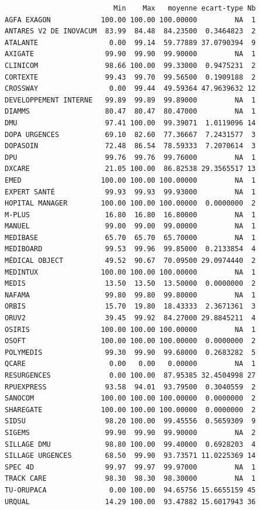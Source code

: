 \documentclass[]{article}
\begin{document}
\begin{verbatim}
                          Min    Max   moyenne ecart-type Nb
AGFA EXAGON            100.00 100.00 100.00000         NA  1
ANTARES V2 DE INOVACUM  83.99  84.48  84.23500  0.3464823  2
ATALANTE                 0.00  99.14  59.77889 37.0790394  9
AXIGATE                 99.90  99.90  99.90000         NA  1
CLINICOM                98.66 100.00  99.33000  0.9475231  2
CORTEXTE                99.43  99.70  99.56500  0.1909188  2
CROSSWAY                 0.00  99.44  49.59364 47.9639632 12
DEVELOPPEMENT INTERNE   99.89  99.89  99.89000         NA  1
DIAMMS                  80.47  80.47  80.47000         NA  1
DMU                     97.41 100.00  99.39071  1.0119096 14
DOPA URGENCES           69.10  82.60  77.36667  7.2431577  3
DOPASOIN                72.48  86.54  78.59333  7.2070614  3
DPU                     99.76  99.76  99.76000         NA  1
DXCARE                  21.05 100.00  86.82538 29.3565517 13
EMED                   100.00 100.00 100.00000         NA  1
EXPERT SANTÉ            99.93  99.93  99.93000         NA  1
HOPITAL MANAGER        100.00 100.00 100.00000  0.0000000  2
M-PLUS                  16.80  16.80  16.80000         NA  1
MANUEL                  99.00  99.00  99.00000         NA  1
MEDIBASE                65.70  65.70  65.70000         NA  1
MEDIBOARD               99.53  99.96  99.85000  0.2133854  4
MÉDICAL OBJECT          49.52  90.67  70.09500 29.0974440  2
MEDINTUX               100.00 100.00 100.00000         NA  1
MEDIS                   13.50  13.50  13.50000  0.0000000  2
NAFAMA                  99.80  99.80  99.80000         NA  1
ORBIS                   15.70  19.80  18.43333  2.3671361  3
ORUV2                   39.45  99.92  84.27000 29.8845211  4
OSIRIS                 100.00 100.00 100.00000         NA  1
OSOFT                  100.00 100.00 100.00000  0.0000000  2
POLYMEDIS               99.30  99.90  99.68000  0.2683282  5
QCARE                    0.00   0.00   0.00000         NA  1
RESURGENCES              0.00 100.00  87.95385 32.4504998 27
RPUEXPRESS              93.58  94.01  93.79500  0.3040559  2
SANOCOM                100.00 100.00 100.00000  0.0000000  2
SHAREGATE              100.00 100.00 100.00000  0.0000000  2
SIDSU                   98.20 100.00  99.45556  0.5659309  9
SIGEMS                  99.90  99.90  99.90000         NA  2
SILLAGE DMU             98.80 100.00  99.40000  0.6928203  4
SILLAGE URGENCES        68.50  99.90  93.73571 11.0225369 14
SPEC 4D                 99.97  99.97  99.97000         NA  1
TRACK CARE              98.30  98.30  98.30000         NA  1
TU-ORUPACA               0.00 100.00  94.65756 15.6655159 45
URQUAL                  14.29 100.00  93.47882 15.6017943 36
\end{verbatim}
\end{document}
